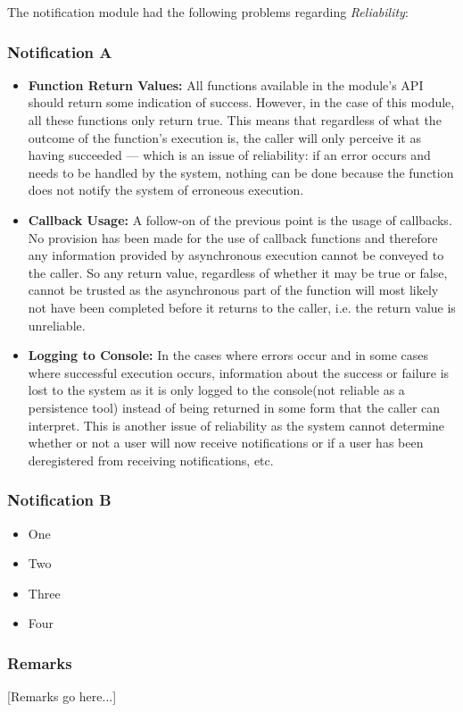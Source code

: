 
The notification module had the following problems regarding \emph{Reliability}:
\subsubsection*{Notification A}
\begin{itemize}
    \item \textbf{Function Return Values:}\newline
     All functions available in the module's API should return some indication of success.
     However, in the case of this module, all these functions only return true. This means that 
     regardless of what the outcome of the function's execution is, the caller will only perceive it as 
     having succeeded --- which is an issue of reliability: if an error occurs and needs to be handled by the system, 
     nothing can be done because the function does not notify the system of erroneous execution.
     \item \textbf{Callback Usage:}\newline
     A follow-on of the previous point is the usage of callbacks.
     No provision has been made for the use of callback functions and therefore any 
     information provided by asynchronous execution cannot be conveyed to the caller. So any return value, regardless of whether it may be true or false, cannot be trusted as the asynchronous part of the function will most likely not have been completed before it returns to the caller, i.e. the return value is unreliable.
     \item \textbf{Logging to Console:}\newline
     In the cases where errors occur and in some cases where successful execution occurs, information about the success or failure is lost to the system as it is only logged to the console(not reliable as a persistence tool) instead of being returned in some form that the caller can interpret. This is another issue of reliability as the system cannot determine whether or not a user will now receive notifications or if a user has been deregistered from receiving notifications, etc.
\end{itemize}
\subsubsection*{Notification B}
\begin{itemize}
    \item One 
    \item Two 
    \item Three 
    \item Four 
\end{itemize}
\subsubsection*{Remarks}
[Remarks go here...]